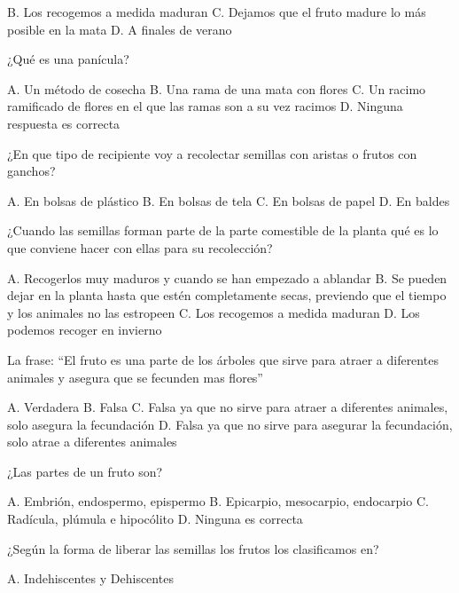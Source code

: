 \documentclass[11pt]{exam}
\begin{document}
{\begin{questions}
\begin{checkboxes}
    \CorrectChoice B. Los recogemos a medida maduran
    \choice C. Dejamos que el fruto madure lo más posible en la mata
    \choice D. A finales de verano
  \end{checkboxes}
  \newpage
\question ¿Qué es una panícula?
  \begin{checkboxes}
    \choice A. Un método de cosecha
    \choice B. Una rama de una mata con flores
    \CorrectChoice C. Un racimo ramificado de flores en el que las ramas son a
    su vez racimos
    \choice D. Ninguna respuesta es correcta 
  \end{checkboxes}
\question ¿En que tipo de recipiente voy a recolectar semillas con aristas o
  frutos con ganchos?
  \begin{checkboxes}
    \choice A. En bolsas de plástico
    \choice B. En bolsas de tela
    \CorrectChoice C. En bolsas de papel
    \choice D. En baldes
  \end{checkboxes}
\question ¿Cuando las semillas forman parte de la parte comestible de la planta
  qué es lo que conviene hacer con ellas para su recolección?
  \begin{checkboxes}
    \choice A. Recogerlos muy maduros y cuando se han empezado a ablandar
    \CorrectChoice B. Se pueden dejar en la planta hasta que estén completamente
    secas, previendo que el tiempo y los animales no las estropeen
    \choice C. Los recogemos a medida maduran
    \choice D. Los podemos recoger en invierno
  \end{checkboxes}
\question La frase: ``El fruto es una parte de los árboles que sirve para atraer
a diferentes animales y asegura que se fecunden mas flores''
\begin{checkboxes}
  \choice A. Verdadera
  \CorrectChoice B. Falsa
  \choice C. Falsa ya que no sirve para atraer a diferentes animales, solo
  asegura la fecundación
  \choice D. Falsa ya que no sirve para asegurar la fecundación, solo atrae a
  diferentes animales
\end{checkboxes}
\question ¿Las partes de un fruto son?
\begin{checkboxes}
  \choice A. Embrión, endospermo, epispermo
  \CorrectChoice B. Epicarpio, mesocarpio, endocarpio
  \choice C. Radícula, plúmula e hipocólito
  \choice D. Ninguna es correcta
\end{checkboxes}
\question ¿Según la forma de liberar las semillas los frutos los clasificamos
  en?
  \begin{checkboxes}
    \CorrectChoice A. Indehiscentes y Dehiscentes

\end{checkboxes}
\end{questions}}
\end{document}
